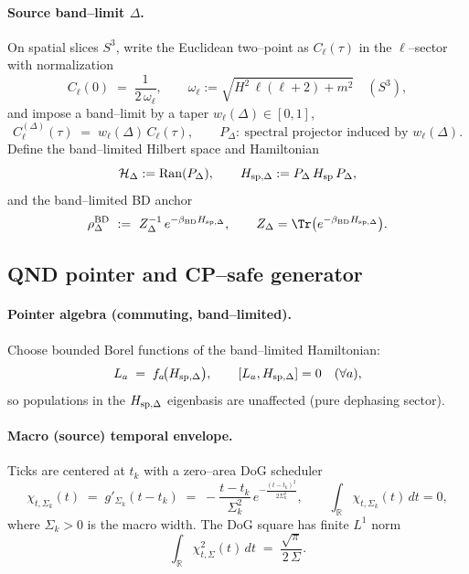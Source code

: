 \documentclass[10pt]{article}
\theoremstyle{definition}
\theoremstyle{plain}
\begin{document}
\paragraph{Source band–limit \(\Delta\).}\label{par:uom-main-211}
On spatial slices \(S^3\), write the Euclidean two–point as
\(C_\ell(\tau)\) in the \(\ell\)–sector with normalization
\[
C_\ell(0)\;=\;\frac{1}{2\,\omega_\ell},\qquad \omega_\ell:=\sqrt{H^2\,\ell(\ell+2)+m^2}\quad (S^3),
\]
and impose a band–limit by a taper \(w_\ell(\Delta)\in[0,1]\),
\[
C_\ell^{(\Delta)}(\tau)\;=\;w_\ell(\Delta)\,C_\ell(\tau),\qquad
P_\Delta:\ \text{spectral projector induced by } w_\ell(\Delta).
\]
Define the band–limited Hilbert space and Hamiltonian
\[
\mathcal H_\Delta:=\mathrm{Ran}(P_\Delta),\qquad
H_{{\rm sp},\Delta}:=P_\Delta\,H_{\rm sp}\,P_\Delta,
\]
and the band–limited BD anchor
\[
\rho^{\rm BD}_\Delta\ :=\ Z_\Delta^{-1}\,e^{-\beta_{\rm BD}H_{{\rm sp},\Delta}},\qquad
Z_\Delta=\Tr\big(e^{-\beta_{\rm BD}H_{{\rm sp},\Delta}}\big).
\]

\subsection{QND pointer and CP–safe generator}
\label{app:dS-collapse:qnd}
\paragraph{Pointer algebra (commuting, band–limited).}\label{par:uom-main-212}
Choose bounded Borel functions of the band–limited Hamiltonian:
\begin{equation}
L_a\;=\;f_a\!\big(H_{{\rm sp},\Delta}\big),\qquad
[L_a,H_{{\rm sp},\Delta}]=0\quad(\forall a),
\label{eq:app-qnd-L}
\end{equation}
so populations in the \(H_{{\rm sp},\Delta}\) eigenbasis are unaffected (pure dephasing sector).

\paragraph{Macro (source) temporal envelope.}\label{par:uom-main-213}
Ticks are centered at \(t_k\) with a zero–area DoG scheduler
\begin{equation}
\chi_{t,\Sigma_k}(t)\;=\;g'_{\Sigma_k}(t-t_k)\;=\;-\frac{t-t_k}{\Sigma_k^{2}}\,e^{-\frac{(t-t_k)^2}{2\Sigma_k^2}},
\qquad \int_{\mathbb R}\chi_{t,\Sigma_k}(t)\,dt=0,
\label{eq:app-dog}
\end{equation}
where \(\Sigma_k>0\) is the macro width. The DoG square has finite \(L^1\) norm
\begin{equation}
\int_{\mathbb R}\chi_{t,\Sigma}^2(t)\,dt\;=\;\frac{\sqrt{\pi}}{2\,\Sigma}.
\label{eq:app-dog-L2}
\end{equation}
\end{document}

